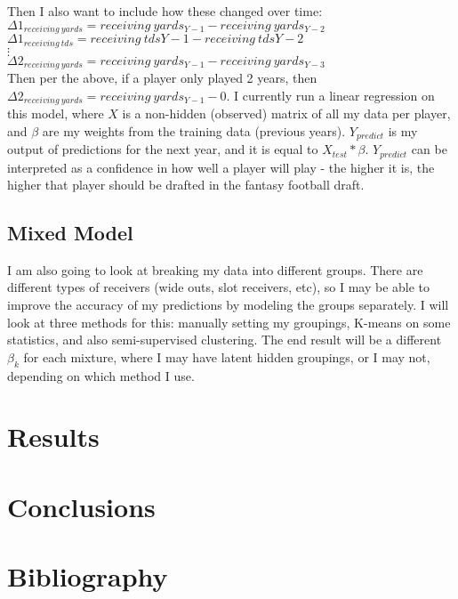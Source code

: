 \documentclass{article} %
\begin{document}
Then I also want to include how these changed over time: \\

$\Delta1_{receiving \ yards} = receiving \ yards_{Y-1} - receiving \ yards_{Y-2}$ \\
$\Delta1_{receiving \ tds} = receiving \ tds{Y-1} - receiving \ tds{Y-2}$ \\
$\vdots$ \\
$\Delta2_{receiving \ yards} = receiving \ yards_{Y-1} - receiving \ yards_{Y-3}$ \\

Then per the above, if a player only played 2 years, then $\Delta2_{receiving \ yards} = receiving \ yards_{Y-1} - 0$. I currently run a linear regression on this model, where $X$ is a non-hidden (observed) matrix of all my data per player, and $\beta$ are my weights from the training data (previous years). $Y_{predict}$ is my output of predictions for the next year, and it is equal to $X_{test} * \beta$. $Y_{predict}$ can be interpreted as a confidence in how well a player will play - the higher it is, the higher that player should be drafted in the fantasy football draft. \\

\subsection{Mixed Model}

I am also going to look at breaking my data into different groups. There are different types of receivers (wide outs, slot receivers, etc), so I may be able to improve the accuracy of my predictions by modeling the groups separately. I will look at three methods for this: manually setting my groupings, K-means on some statistics, and also semi-supervised clustering. The end result will be a different $\beta_k$ for each mixture, where I may have latent hidden groupings, or I may not, depending on which method I use.


\section{Results}


\section{Conclusions}


\newpage

\section{Bibliography}
\end{document}
